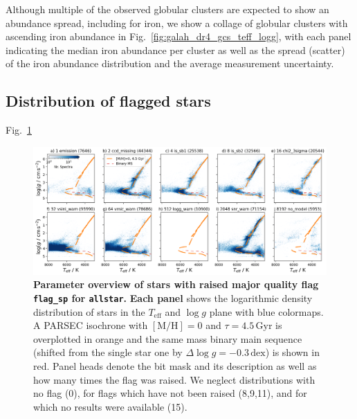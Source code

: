 \documentclass[
  journal=pasa,
  manuscript=research-paper, %
  year=2024,
  volume=37
]{cup-journal}
\newcommand{\Teff}{$T_\mathrm{eff}$\xspace}
\newcommand{\logg}{$\log g$\xspace}
\begin{document}
Although multiple of the observed globular clusters are expected to show an abundance spread, including for iron, we show a collage of globular clusters with ascending iron abundance in Fig.~\ref{fig:galah_dr4_gcs_teff_logg}, with each panel indicating the median iron abundance per cluster as well as the spread (scatter) of the iron abundance distribution and the average measurement uncertainty.

\subsection{Distribution of flagged stars}

Fig.~\ref{fig:flag_sp_overview_allstar}

\begin{figure}[ht]
 \centering
 \includegraphics[width=\textwidth]{figures/flag_sp_overview_allstar.png}
 \caption{\textbf{Parameter overview of stars with raised major quality flag \texttt{flag\_sp} for \texttt{allstar}.}
 \textbf{Each panel} shows the logarithmic density distribution of stars in the \Teff and \logg plane with blue colormaps. A PARSEC isochrone with $\mathrm{[M/H]}=0$ and $\tau = 4.5\,\mathrm{Gyr}$ is overplotted in orange and the same mass binary main sequence (shifted from the single star one by $\Delta \log g = -0.3\,\mathrm{dex}$) is shown in red. Panel heads denote the bit mask and its description as well as how many times the flag was raised. We neglect distributions with no flag (0), for flags which have not been raised (8,9,11), and for which no results were available (15).} \label{fig:flag_sp_overview_allstar}
\end{figure}
\end{document}
